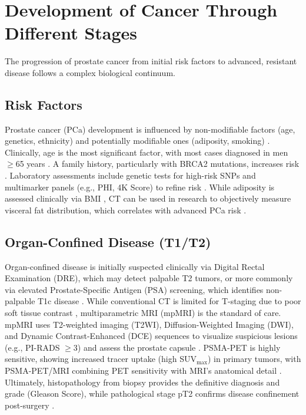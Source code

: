\documentclass[11pt, a4paper]{article}
\begin{document}
\section{Development of Cancer Through Different Stages}
The progression of prostate cancer from initial risk factors to advanced, resistant disease follows a complex biological continuum. 

\subsection{Risk Factors}
Prostate cancer (PCa) development is influenced by non-modifiable factors (age, genetics, ethnicity) and potentially modifiable ones (adiposity, smoking) \cite{PerezCornagoDunneram2022,CariolouMarkozannes2023}. Clinically, age is the most significant factor, with most cases diagnosed in men $\geq$65 years \cite{DesaiGami2024}. A family history, particularly with BRCA2 mutations, increases risk \cite{CarpagnanoEusebi2020}. Laboratory assessments include genetic tests for high-risk SNPs  and multimarker panels (e.g., PHI, 4K Score) to refine risk \cite{ChenWang2023}. While adiposity is assessed clinically via BMI \cite{DickermanTorfadottir2019}, CT can be used in research to objectively measure visceral fat distribution, which correlates with advanced PCa risk \cite{DickermanTorfadottir2019}.

\subsection{Organ-Confined Disease (T1/T2)}
Organ-confined disease is initially suspected clinically via Digital Rectal Examination (DRE), which may detect palpable T2 tumors, or more commonly via elevated Prostate-Specific Antigen (PSA) screening, which identifies non-palpable T1c disease \cite{OliveiraFerreira2023,GhezzoBezzi2022}. While conventional CT is limited for T-staging due to poor soft tissue contrast \cite{UrsoRocca2022}, multiparametric MRI (mpMRI) is the standard of care. mpMRI uses T2-weighted imaging (T2WI), Diffusion-Weighted Imaging (DWI), and Dynamic Contrast-Enhanced (DCE) sequences to visualize suspicious lesions (e.g., PI-RADS $\geq$3) and assess the prostate capsule \cite{OliveiraFerreira2023,DesaiGami2024}. PSMA-PET is highly sensitive, showing increased tracer uptake (high SUV$_{\text{max}}$) in primary tumors, with PSMA-PET/MRI combining PET sensitivity with MRI's anatomical detail \cite{VetroneMei2023,GarznTorres2018}. Ultimately, histopathology from biopsy provides the definitive diagnosis and grade (Gleason Score), while pathological stage pT2 confirms disease confinement post-surgery \cite{GhezzoBezzi2022}.
\end{document}
